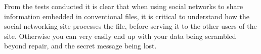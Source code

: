 
From the tests conducted it is clear that when using social networks to share information embedded in conventional files, it is critical to understand how the social networking site processes the file, before serving it to the other users of the site.
Otherwise you can very easily end up with your data being scrambled beyond repair, and the secret message being lost.